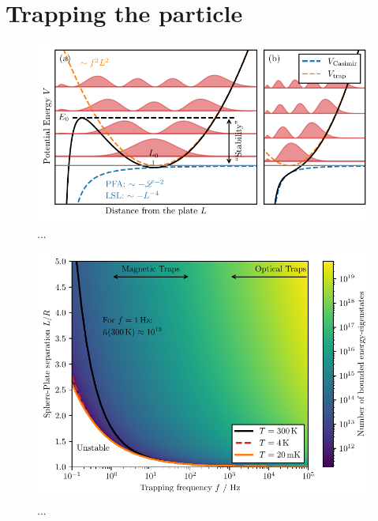 \section{Trapping the particle}\label{sec:4:trapping}

\begin{figure}[!htbp]
  \centering
  \includegraphics[width=\textwidth]{./../figures/others/trapping-potential-eigenstates.pdf}
  \caption{...}
  \label{fig:4:trap-eigenstates}
\end{figure}

\begin{figure}[!htbp]
  \centering
  \includegraphics[width=\textwidth]{./../figures/others/trap-stability.pdf}
  \caption{...}
  \label{fig:4:trap-stability}
\end{figure}